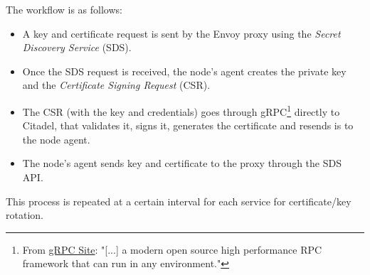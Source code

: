 \noindent The workflow is as follows:

\begin{itemize}
    \item[1.] A key and certificate request is sent by the Envoy proxy using the \textit{Secret Discovery Service} (SDS).
    \item[2.] Once the SDS request is received, the node's agent creates the private key and the \textit{Certificate Signing Request} (CSR).
    \item[3.] The CSR (with the key and credentials) goes through gRPC\footnote{From \href{https://grpc.io/}{gRPC Site}: "[...] a modern open source high performance RPC framework that can run in any environment."} directly to Citadel, that validates it, signs it, generates the certificate and resends is to the node agent.
    \item[4.] The node's agent sends key and certificate to the proxy through the SDS API. 
\end{itemize}

\noindent This process is repeated at a certain interval for each service for certificate/key rotation.



